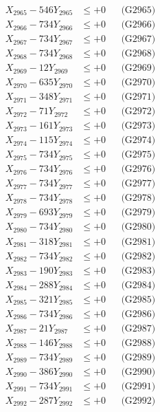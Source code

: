 \documentclass[a4paper,10pt]{article}
\begin{document}
{\begin{align}
X_{2965} - 546Y_{2965} &\leq +0 && \text{(G2965)} \\
X_{2966} - 734Y_{2966} &\leq +0 && \text{(G2966)} \\
X_{2967} - 734Y_{2967} &\leq +0 && \text{(G2967)} \\
X_{2968} - 734Y_{2968} &\leq +0 && \text{(G2968)} \\
X_{2969} - 12Y_{2969} &\leq +0 && \text{(G2969)} \\
X_{2970} - 635Y_{2970} &\leq +0 && \text{(G2970)} \\
\allowbreak
X_{2971} - 348Y_{2971} &\leq +0 && \text{(G2971)} \\
X_{2972} - 71Y_{2972} &\leq +0 && \text{(G2972)} \\
X_{2973} - 161Y_{2973} &\leq +0 && \text{(G2973)} \\
X_{2974} - 115Y_{2974} &\leq +0 && \text{(G2974)} \\
X_{2975} - 734Y_{2975} &\leq +0 && \text{(G2975)} \\
X_{2976} - 734Y_{2976} &\leq +0 && \text{(G2976)} \\
X_{2977} - 734Y_{2977} &\leq +0 && \text{(G2977)} \\
X_{2978} - 734Y_{2978} &\leq +0 && \text{(G2978)} \\
X_{2979} - 693Y_{2979} &\leq +0 && \text{(G2979)} \\
X_{2980} - 734Y_{2980} &\leq +0 && \text{(G2980)} \\
\allowbreak
X_{2981} - 318Y_{2981} &\leq +0 && \text{(G2981)} \\
X_{2982} - 734Y_{2982} &\leq +0 && \text{(G2982)} \\
X_{2983} - 190Y_{2983} &\leq +0 && \text{(G2983)} \\
X_{2984} - 288Y_{2984} &\leq +0 && \text{(G2984)} \\
X_{2985} - 321Y_{2985} &\leq +0 && \text{(G2985)} \\
X_{2986} - 734Y_{2986} &\leq +0 && \text{(G2986)} \\
X_{2987} - 21Y_{2987} &\leq +0 && \text{(G2987)} \\
X_{2988} - 146Y_{2988} &\leq +0 && \text{(G2988)} \\
X_{2989} - 734Y_{2989} &\leq +0 && \text{(G2989)} \\
X_{2990} - 386Y_{2990} &\leq +0 && \text{(G2990)} \\
\allowbreak
X_{2991} - 734Y_{2991} &\leq +0 && \text{(G2991)} \\
X_{2992} - 287Y_{2992} &\leq +0 && \text{(G2992)} \\

\end{align}}
\end{document}
